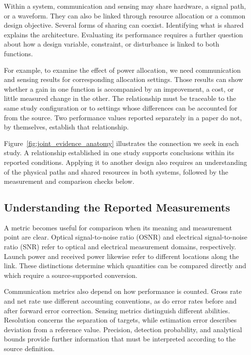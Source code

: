 Within a system, communication and sensing may share hardware, a signal path,
or a waveform. They can also be linked through resource allocation or a common
design objective. Several forms of sharing can coexist. Identifying what is
shared explains the architecture. Evaluating its performance requires a
further question about how a design variable, constraint, or disturbance is
linked to both functions.

For example, to examine the effect of power allocation, we need communication
and sensing results for corresponding allocation settings. Those results can
show whether a gain in one function is accompanied by an improvement, a cost,
or little measured change in the other. The relationship must be traceable
to the same study configuration or to settings whose differences can be
accounted for from the source. Two performance values reported separately in a
paper do not, by themselves, establish that relationship.

Figure~\ref{fig:joint_evidence_anatomy} illustrates the connection we seek in
each study. A relationship established in one study supports conclusions
within its reported conditions. Applying it to another design also requires
an understanding of the physical paths and shared resources in both systems,
followed by the measurement and comparison checks below.

\subsection{Understanding the Reported Measurements}

A metric becomes useful for comparison when its meaning and measurement
point are clear. Optical signal-to-noise ratio (OSNR) and electrical
signal-to-noise ratio (SNR) refer to optical and electrical measurement
domains, respectively.
Launch power and received power likewise refer to different locations along
the link. These distinctions determine which quantities can be compared
directly and which require a source-supported conversion.

Communication metrics also depend on how performance is counted. Gross rate
and net rate use different accounting conventions, as do error rates before
and after forward error correction. Sensing metrics distinguish different
abilities. Resolution concerns the separation of targets, while estimation
error describes deviation from a reference value. Precision, detection
probability, and analytical bounds provide further information that must be
interpreted according to the source definition.

